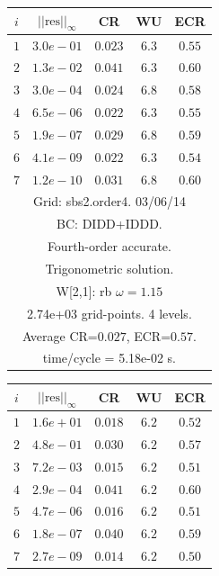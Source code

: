 \begin{table}[hbt]
\begin{center}
{\tablefontsize
\begin{tabular}{|c|c|c|c|c|} \hline 
 $i$   & $\vert\vert\mbox{res}\vert\vert_\infty$  &  CR     &  WU    & ECR  \\   \hline 
 $ 1$  & $ 3.0e-01$ & $0.023$ & $ 6.3$ & $0.55$ \\ 
 $ 2$  & $ 1.3e-02$ & $0.041$ & $ 6.3$ & $0.60$ \\ 
 $ 3$  & $ 3.0e-04$ & $0.024$ & $ 6.8$ & $0.58$ \\ 
 $ 4$  & $ 6.5e-06$ & $0.022$ & $ 6.3$ & $0.55$ \\ 
 $ 5$  & $ 1.9e-07$ & $0.029$ & $ 6.8$ & $0.59$ \\ 
 $ 6$  & $ 4.1e-09$ & $0.022$ & $ 6.3$ & $0.54$ \\ 
 $ 7$  & $ 1.2e-10$ & $0.031$ & $ 6.8$ & $0.60$ \\ 
\hline 
\multicolumn{5}{|c|}{Grid: sbs2.order4. 03/06/14}  \\
\multicolumn{5}{|c|}{BC: DIDD+IDDD.}  \\
\multicolumn{5}{|c|}{Fourth-order accurate.}  \\
\multicolumn{5}{|c|}{Trigonometric solution.}  \\
\multicolumn{5}{|c|}{W[2,1]: rb $\omega=1.15$}  \\
\multicolumn{5}{|c|}{2.74e+03 grid-points. 4 levels.}  \\
\multicolumn{5}{|c|}{Average CR=$0.027$, ECR=$0.57$.}  \\
\multicolumn{5}{|c|}{time/cycle = 5.18e-02 s.}  \\
\hline 
\end{tabular}
\begin{tabular}{|c|c|c|c|c|} \hline 
 $i$   & $\vert\vert\mbox{res}\vert\vert_\infty$  &  CR     &  WU    & ECR  \\   \hline 
 $ 1$  & $ 1.6e+01$ & $0.018$ & $ 6.2$ & $0.52$ \\ 
 $ 2$  & $ 4.8e-01$ & $0.030$ & $ 6.2$ & $0.57$ \\ 
 $ 3$  & $ 7.2e-03$ & $0.015$ & $ 6.2$ & $0.51$ \\ 
 $ 4$  & $ 2.9e-04$ & $0.041$ & $ 6.2$ & $0.60$ \\ 
 $ 5$  & $ 4.7e-06$ & $0.016$ & $ 6.2$ & $0.51$ \\ 
 $ 6$  & $ 1.8e-07$ & $0.040$ & $ 6.2$ & $0.59$ \\ 
 $ 7$  & $ 2.7e-09$ & $0.014$ & $ 6.2$ & $0.50$ \\ 

\end{tabular}}
\end{center}
\end{table}
